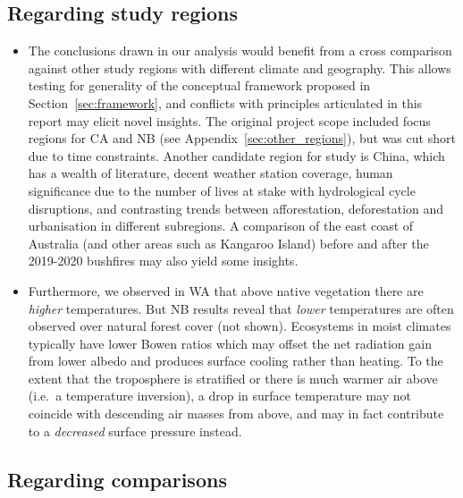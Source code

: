 \subsection{Regarding study regions}

\begin{itemize}
	\item The conclusions drawn in our analysis would benefit from a cross comparison against other study regions with different climate and geography. This allows testing for generality of the conceptual framework proposed in Section~\ref{sec:framework}, and conflicts with principles articulated in this report may elicit novel insights. The original project scope included focus regions for \ac{CA} and \ac{NB} (see Appendix~\ref{sec:other_regions}), but was cut short due to time constraints. Another candidate region for study is China, which has a wealth of literature, decent weather station coverage, human significance due to the number of lives at stake with hydrological cycle disruptions, and contrasting trends between afforestation, deforestation and urbanisation in different subregions. A comparison of the east coast of Australia (and other areas such as Kangaroo Island) before and after the 2019-2020 bushfires may also yield some insights.
	\item Furthermore, we observed in \ac{WA} that above native vegetation there are \textit{higher} temperatures. But \ac{NB} results reveal that \textit{lower} temperatures are often observed over natural forest cover (not shown). Ecosystems in moist climates typically have lower Bowen ratios which may offset the net radiation gain from lower albedo and produces surface cooling rather than heating. To the extent that the troposphere is stratified or there is much warmer air above (i.e.\ a temperature inversion), a drop in surface temperature may not coincide with descending air masses from above, and may in fact contribute to a \textit{decreased} surface pressure instead. 
\end{itemize}

\subsection{Regarding comparisons}

